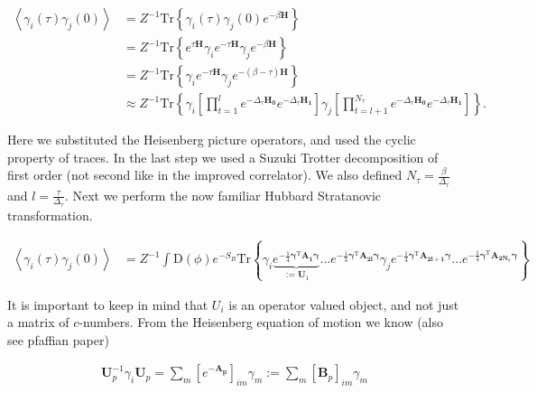 \documentclass{article}
\begin{document}
\begin{align}
	\left< \gamma_{i}(\tau) \gamma_j(0)\right> &= Z^{-1} \mathrm{Tr}\left\{ \gamma_{i}(\tau) \gamma_{j}(0) e^{-\beta \boldsymbol{H} }  \right\}  \nonumber\\
	&= Z^{-1} \mathrm{Tr}\left\{ e^{\tau\boldsymbol{H}}\gamma_{i}e^{-\tau\boldsymbol{H}  } \gamma_{j}e^{-\beta \boldsymbol{H} }  \right\} \nonumber \\
	&= Z^{-1}\mathrm{Tr}\left\{ \gamma_{i}e^{-\tau\boldsymbol{H}  } \gamma_{j}e^{-\left(\beta - \tau\right) \boldsymbol{H} } \right\}  \nonumber \\
	&\approx Z^{-1} \mathrm{Tr}\left\{ \gamma_{i}\left[\prod_{t=1}^{l} e^{-\Delta_\tau \boldsymbol{H_{0} } }e^{-\Delta_\tau \boldsymbol{H_{1} }}\right]\gamma_{j}\left[\prod_{t=l+1}^{N_{\tau} } e^{-\Delta_\tau \boldsymbol{H_{0} } }e^{-\Delta_\tau \boldsymbol{H_{1} }}\right]   \right\}. 
\end{align}

Here we substituted the Heisenberg picture operators, and used the cyclic property of traces. In the last step we used a Suzuki Trotter decomposition of first order (not second like in the improved correlator). We also defined $N_{\tau} = \frac{\beta}{\Delta_{\tau}} $ and $l = \frac{\tau}{\Delta_{\tau} } $. Next we perform the now familiar Hubbard Stratanovic transformation. 

\begin{align}
	\left< \gamma_{i}(\tau) \gamma_j(0)\right> &= Z^{-1}\int_{ }^{ } \mathrm{D}\left(\phi\right)  e^{-S_{B} } \mathrm{Tr}\left\{ \gamma_{i}\underbrace{e^{-\frac{1}{4}\boldsymbol{\gamma}^{\mathrm{T}} \boldsymbol{A_{1}\boldsymbol{\gamma} } }}_{:=\boldsymbol{U} _{1} }  ... e^{-\frac{1}{4}\boldsymbol{\gamma}^{\mathrm{T}} \boldsymbol{A_{2l}\boldsymbol{\gamma} } } \gamma_{j} e^{-\frac{1}{4}\boldsymbol{\gamma}^{\mathrm{T}} \boldsymbol{A_{2l+1}\boldsymbol{\gamma} } }...e^{-\frac{1}{4}\boldsymbol{\gamma}^{\mathrm{T}} \boldsymbol{A_{2N_{\tau} }\boldsymbol{\gamma} } }    \right\} 
\end{align} 

It is important to keep in mind that $U_i$ is an operator valued object, and not just a matrix of $c$-numbers. From the Heisenberg equation of motion we know (also see pfaffian paper)

\begin{align}
	\boldsymbol{U}^{-1}_{p}\gamma_{i}\boldsymbol{U}_{p} = \sum_{m}^{ }\left[e^{-\boldsymbol{A_{p} } }\right]_{im} \gamma_{m} := \sum_{m}^{ } \left[\boldsymbol{B}_{p}\right]_{im} \gamma_{m}  
\end{align}
\end{document}

